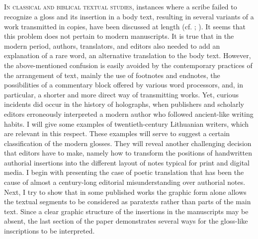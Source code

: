 \begin{paper}
\section*{} 
\textsc{In classical and biblical textual studies}, instances where a scribe failed to recognize a gloss and its insertion in a body text, resulting in several variants of a work transmitted in copies, have been discussed at length (cf. \citealt[17, 31--32]{renehan_greek_1969}; \citealt[16--17]{walker_interpolations_2001}). It seems that this problem does not pertain to modern
manuscripts. It is true that in the modern period, authors, translators,
and editors also needed to add an explanation of a rare word, an
alternative translation to the body text. However, the above-mentioned confusion is easily avoided by the contemporary
practices of the arrangement of text, mainly the use of footnotes and endnotes, the
possibilities of a commentary block offered by various word processors, and,
in particular, a shorter and more direct way of transmitting works. Yet, curious incidents
did occur in the history of holographs, when publishers and scholarly editors erroneously interpreted a modern author who
followed \label{qtSubacius}ancient-like writing habits. I will give some examples of
twentieth-century Lithuanian writers, which are relevant in this
respect. These examples will serve to suggest a certain classification
of the modern glosses. They will reveal another challenging decision that editors have to
make, namely how to transform the positions of
handwritten authorial insertions into the different layout of notes typical for print and digital media. I begin with presenting the
case of poetic translation that has been the cause of almost a
century-long editorial misunderstanding over authorial notes. Next, I
try to show that in some published works the graphic form alone allows
the textual segments to be considered as paratexts rather than parts of
the main text. Since a clear graphic structure of the insertions in the
manuscripts may be absent, the last section of the paper demonstrates
several ways for the gloss-like inscriptions to be interpreted.


\end{paper}
